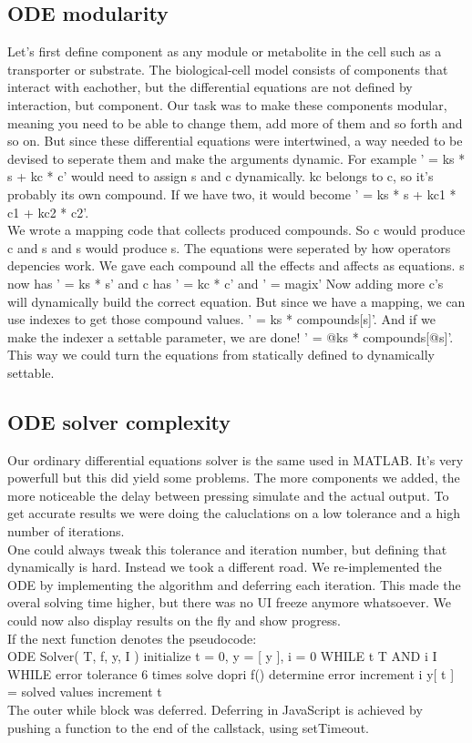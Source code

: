 \documentclass[10pt,a4paper]{report}
\begin{document}
		\subsection{ODE modularity}
			Let's first define component as any module or metabolite in the cell such as a transporter or substrate. The biological-cell model consists of components that interact with eachother, but the differential equations are not defined by interaction, but component. Our task was to make these components modular, meaning you need to be able to change them, add more of them and so forth and so on. But since these differential equations were intertwined, a way needed to be devised to seperate them and make the arguments dynamic. For example ' = ks * s + kc * c' would need to assign s and c dynamically. kc belongs to c, so it's probably its own compound. If we have two, it would become ' = ks * s + kc1 * c1 + kc2 * c2'.\\
			We wrote a mapping code that collects produced compounds. So c would produce c and s and s would produce s. The equations were seperated by how operators depencies work. We gave each compound all the effects and affects as equations. s now has ' = ks * s' and c has ' = kc * c' and ' = magix' Now adding more c's will dynamically build the correct equation. But since we have a mapping, we can use indexes to get those compound values. ' = ks * compounds[s]'. And if we make the indexer a settable parameter, we are done! ' = @ks * compounds[@s]'. \\
			This way we could turn the equations from statically defined to dynamically settable.
			
		\subsection{ODE solver complexity}
			Our ordinary differential equations solver is the same used in MATLAB. It's very powerfull but this did yield some problems. The more components we added, the more noticeable the delay between pressing simulate and the actual output. To get accurate results we were doing the caluclations on a low tolerance and a high number of iterations. \\
			One could always tweak this tolerance and iteration number, but defining that dynamically is hard. Instead we took a different road. We re-implemented the ODE by implementing the algorithm and deferring each iteration. This made the overal solving time higher, but there was no UI freeze anymore whatsoever. We could now also display results on the fly and show progress.\\
			If the next function denotes the pseudocode:\\
			ODE Solver( T, f, y, I )
				initialize t = 0, y = [ y ], i = 0
				WHILE t \lt T AND i \lt I
				    WHILE error \gt tolerance
						6 times solve dopri f()
						determine error
						increment i
					y[ t ] = solved values
					increment t\\
			The outer while block was deferred. Deferring in JavaScript is achieved by pushing a function to the end of the callstack, using setTimeout.
		
\end{document}
